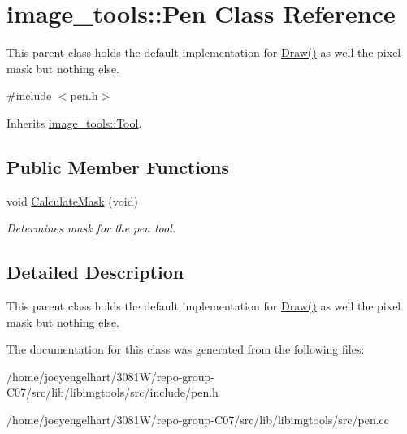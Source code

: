 \hypertarget{classimage__tools_1_1Pen}{}\section{image\+\_\+tools\+:\+:Pen Class Reference}
\label{classimage__tools_1_1Pen}


This parent class holds the default implementation for \hyperlink{classimage__tools_1_1Tool_aa5a313769f2a2c5c83b816da81e82bd2}{Draw()} as well the pixel mask but nothing else.  




{\ttfamily \#include $<$pen.\+h$>$}



Inherits \hyperlink{classimage__tools_1_1Tool}{image\+\_\+tools\+::\+Tool}.

\subsection*{Public Member Functions}
\begin{DoxyCompactItemize}
\item 
void \hyperlink{classimage__tools_1_1Pen_a5b72760500fb1891ca2764a4663c146c}{Calculate\+Mask} (void)\hypertarget{classimage__tools_1_1Pen_a5b72760500fb1891ca2764a4663c146c}{}\label{classimage__tools_1_1Pen_a5b72760500fb1891ca2764a4663c146c}

\begin{DoxyCompactList}\small\item\em Determines mask for the pen tool. \end{DoxyCompactList}\end{DoxyCompactItemize}


\subsection{Detailed Description}
This parent class holds the default implementation for \hyperlink{classimage__tools_1_1Tool_aa5a313769f2a2c5c83b816da81e82bd2}{Draw()} as well the pixel mask but nothing else. 

The documentation for this class was generated from the following files\+:\begin{DoxyCompactItemize}
\item 
/home/joeyengelhart/3081\+W/repo-\/group-\/\+C07/src/lib/libimgtools/src/include/pen.\+h\item 
/home/joeyengelhart/3081\+W/repo-\/group-\/\+C07/src/lib/libimgtools/src/pen.\+cc\end{DoxyCompactItemize}
